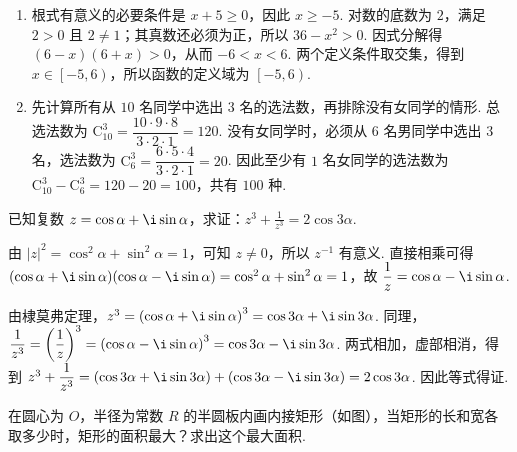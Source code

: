 \documentclass[UTF8,a4paper,oneside,11pt]{ctexbook}
\begin{document}
\begin{solution}
\begin{enumerate}
\item 根式有意义的必要条件是 \(x+5\geq0\)，因此 \(x\geq-5\). 对数的底数为 \(2\)，满足 \(2>0\) 且 \(2\ne1\)；其真数还必须为正，所以 \(36-x^2>0\). 因式分解得 \((6-x)(6+x)>0\)，从而 \(-6<x<6\). 两个定义条件取交集，得到 \(x\in\left[-5,6\right)\)，所以函数的定义域为 \(\left[-5,6\right)\).

\item 先计算所有从 \(10\) 名同学中选出 \(3\) 名的选法数，再排除没有女同学的情形. 总选法数为 \(\mathrm C_{10}^{3}=\dfrac{10\cdot9\cdot8}{3\cdot2\cdot1}=120\). 没有女同学时，必须从 \(6\) 名男同学中选出 \(3\) 名，选法数为 \(\mathrm C_{6}^{3}=\dfrac{6\cdot5\cdot4}{3\cdot2\cdot1}=20\). 因此至少有 \(1\) 名女同学的选法数为 \(\mathrm C_{10}^{3}-\mathrm C_{6}^{3}=120-20=100\)，共有 \(100\) 种.
\end{enumerate}
\end{solution}

\begin{problem}
已知复数 \(z = \cos \alpha + \i\sin \alpha\)，求证：\(z^3 + \frac{1}{z^3} = 2\cos 3\alpha\).
\end{problem}

\begin{solution}
由 \(\left|z\right|^2=\cos^2\alpha+\sin^2\alpha=1\)，可知 \(z\ne0\)，所以 \(z^{-1}\) 有意义. 直接相乘可得 \((\cos\alpha+\i\sin\alpha)(\cos\alpha-\i\sin\alpha)=\cos^2\alpha+\sin^2\alpha=1\)，故 \(\dfrac1z=\cos\alpha-\i\sin\alpha\).

由棣莫弗定理，\(z^3=\left(\cos\alpha+\i\sin\alpha\right)^3=\cos3\alpha+\i\sin3\alpha\). 同理，\(\dfrac1{z^3}=\left(\dfrac1z\right)^3=\left(\cos\alpha-\i\sin\alpha\right)^3=\cos3\alpha-\i\sin3\alpha\). 两式相加，虚部相消，得到 \(z^3+\dfrac1{z^3}=\left(\cos3\alpha+\i\sin3\alpha\right)+\left(\cos3\alpha-\i\sin3\alpha\right)=2\cos3\alpha\). 因此等式得证.
\end{solution}

\begin{problem}
在圆心为 \(O\)，半径为常数 \(R\) 的半圆板内画内接矩形（如图），当矩形的长和宽各取多少时，矩形的面积最大？求出这个最大面积.

\begin{center}
\end{center}
\end{problem}
\end{document}
